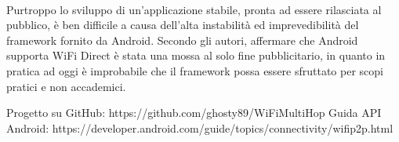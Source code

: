 \documentclass{llncs}
\begin{document}
\paragraph{} Purtroppo lo sviluppo di un'applicazione stabile, pronta ad essere rilasciata al pubblico, è ben difficile a causa dell'alta instabilità ed imprevedibilità del framework fornito da Android. Secondo gli autori, affermare che Android supporta WiFi Direct è stata una mossa al solo fine pubblicitario, in quanto in pratica ad oggi è improbabile che il framework possa essere sfruttato per scopi pratici e non accademici.


\begin{thebibliography}{}
		 Progetto su GitHub: https://github.com/ghosty89/WiFiMultiHop
	 Guida API Android: https://developer.android.com/guide/topics/connectivity/wifip2p.html
\end{thebibliography}
\end{document}
